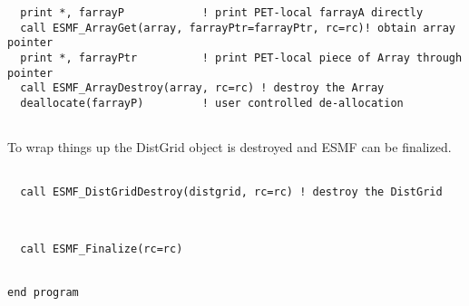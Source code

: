 
 \begin{verbatim}
  print *, farrayP            ! print PET-local farrayA directly
  call ESMF_ArrayGet(array, farrayPtr=farrayPtr, rc=rc)! obtain array pointer
  print *, farrayPtr          ! print PET-local piece of Array through pointer
  call ESMF_ArrayDestroy(array, rc=rc) ! destroy the Array
  deallocate(farrayP)         ! user controlled de-allocation
 
\end{verbatim}
 

   To wrap things up the DistGrid object is destroyed and ESMF can be finalized. 

 \begin{verbatim}

  call ESMF_DistGridDestroy(distgrid, rc=rc) ! destroy the DistGrid
  
 
\end{verbatim}
 

 \begin{verbatim}
  call ESMF_Finalize(rc=rc)
 
\end{verbatim}
 

 \begin{verbatim}
end program
 
\end{verbatim}

\setlength{\parskip}{\oldparskip}
\setlength{\parindent}{\oldparindent}
\setlength{\baselineskip}{\oldbaselineskip}
